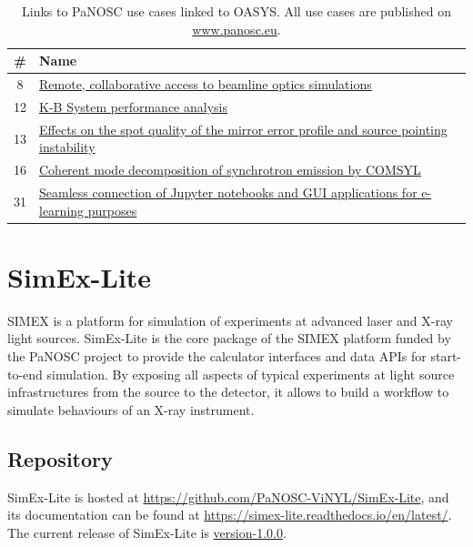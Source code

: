 \documentclass[11pt, a4paper]{article}
\begin{document}
\begin{table}[h!!!]
\centering
\begin{tabular}{c l}
\# & Name \\\hline
8 & \href{https://www.panosc.eu/use-cases/use-case-8-remote-collaborative-access-to-beamline-optics-simulations/}{Remote, collaborative access to beamline optics simulations} \\
12 & \href{https://www.panosc.eu/use-cases/panosc-use-case-12-k-b-system-performance-analysis/}{K-B System performance analysis} \\
13 & \href{https://www.panosc.eu/use-cases/panosc-use-case-13-effects-on-the-spot-quality-of-mirror-error-profile-and-source-pointing-instability/}{Effects on the spot quality of the mirror error profile and source pointing instability} \\
16 & \href{https://www.panosc.eu/use-cases/panosc-use-case-16-coherent-mode-decomposition-of-synchrotron-emission-by-comsyl/}{Coherent mode decomposition of synchrotron emission by COMSYL} \\
31 & \href{https://www.panosc.eu/use-cases/use-case-31-seamless-connection-of-jupyter-notebooks-and-gui-applications-for-e-learning-purposes/}{Seamless connection of Jupyter notebooks and GUI applications for e-learning purposes}
\end{tabular}
\caption{\label{tab:use_cases} Links to PaNOSC use cases linked to OASYS. All use cases are published on \url{www.panosc.eu}.}
\end{table}


\section{SimEx-Lite\label{sec:simex-lite}}

SIMEX \cite{fortmann-grote2016} is a platform for simulation of experiments at advanced laser and X-ray light sources. SimEx-Lite is the core package of the SIMEX platform funded by the PaNOSC project to provide the calculator interfaces and data APIs for start-to-end simulation. By exposing all aspects of typical experiments at light source
infrastructures from the source to the detector, it allows to build a workflow to simulate behaviours of an X-ray instrument.  

\subsection{Repository}
SimEx-Lite is hosted at \url{https://github.com/PaNOSC-ViNYL/SimEx-Lite}, and its documentation can be found at \url{https://simex-lite.readthedocs.io/en/latest/}. The current release of SimEx-Lite is \href{https://pypi.org/project/SimEx-Lite/}{version-1.0.0}.
\end{document}

